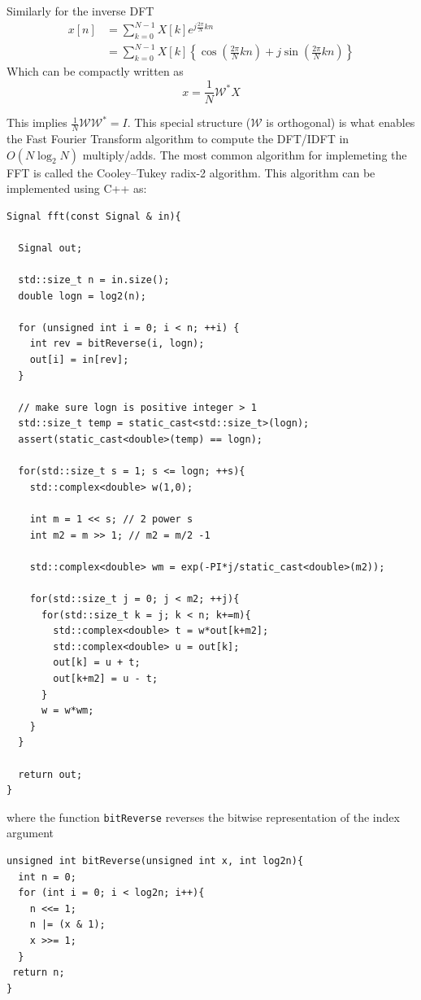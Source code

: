 Similarly for the inverse DFT
\begin{align*}
  x[n] &= \sum_{k = 0}^{N-1}  X[k] e^{j \frac{2\pi}{N}k n}\\
  &= \sum_{k = 0}^{N-1}  X[k] \left\{ \cos\left( \frac{2\pi}{N}k n\right) + j \sin\left(\frac{2\pi}{N}k n \right)\right\}
\end{align*}
Which can be compactly written as
\[
x = \frac{1}{N} \mathcal{W}^{*} X
\]

This implies $\frac{1}{N}\mathcal{W}\mathcal{W}^* = I$. This special structure ($\mathcal{W}$ is orthogonal) is what enables the Fast Fourier Transform algorithm to compute the DFT/IDFT in $O(N\log_2 N)$ multiply/adds. The most common algorithm for implemeting the FFT is called the Cooley–Tukey radix-2 algorithm. This algorithm can be implemented using C++ as:

\begin{verbatim}
Signal fft(const Signal & in){

  Signal out;

  std::size_t n = in.size();
  double logn = log2(n);

  for (unsigned int i = 0; i < n; ++i) {
    int rev = bitReverse(i, logn);
    out[i] = in[rev];
  }

  // make sure logn is positive integer > 1
  std::size_t temp = static_cast<std::size_t>(logn);
  assert(static_cast<double>(temp) == logn);

  for(std::size_t s = 1; s <= logn; ++s){
    std::complex<double> w(1,0);

    int m = 1 << s; // 2 power s
    int m2 = m >> 1; // m2 = m/2 -1

    std::complex<double> wm = exp(-PI*j/static_cast<double>(m2));

    for(std::size_t j = 0; j < m2; ++j){
      for(std::size_t k = j; k < n; k+=m){
        std::complex<double> t = w*out[k+m2];
        std::complex<double> u = out[k];
        out[k] = u + t;
        out[k+m2] = u - t;
      }
      w = w*wm;
    }
  }

  return out;
}
\end{verbatim}

where the function \texttt{bitReverse} reverses the bitwise representation of the index argument

\begin{verbatim}
unsigned int bitReverse(unsigned int x, int log2n){
  int n = 0;
  for (int i = 0; i < log2n; i++){
    n <<= 1;
    n |= (x & 1);
    x >>= 1;
  }
 return n;
}
\end{verbatim}

